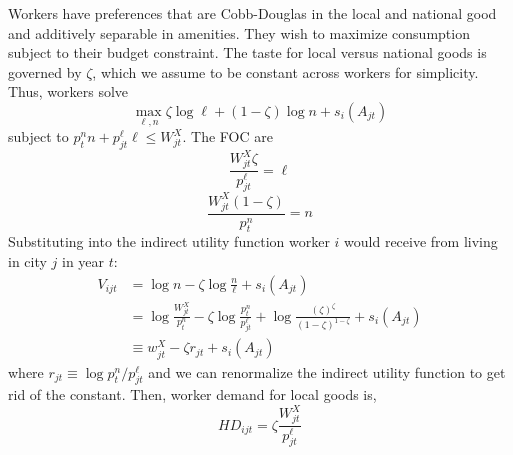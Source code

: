\documentclass{article}
\begin{document}
Workers have preferences that are Cobb-Douglas in  the local and national good and additively separable in amenities. They wish to maximize consumption subject to their budget constraint. The taste for local versus national goods is governed by $\zeta$, which we assume to be constant across workers for simplicity. Thus, workers solve 
\begin{equation}\label{eq_worker_util_max}
    \max_{\ell,n} \zeta \log \ell + (1-\zeta)\log n + s_i(A_{jt})
\end{equation}
subject to $p^n_t n + p^\ell_{jt}\ell\leq W^X_{jt}$. The FOC are
$$\frac{W^X_{jt}\zeta}{p^\ell_{jt}} = \ell$$
$$\frac{W^X_{jt}(1-\zeta)}{p^n_t} = n$$
Substituting into the indirect utility function worker $i$ would receive from living in city $j$ in year $t$:
\begin{align}
    V_{ijt} &= \log n - \zeta \log \frac{n}{\ell} + s_i(A_{jt}) \nonumber \\ 
    &= \log \frac{W^X_{jt}}{p^n_{t}} - \zeta \log\frac{p^n_{t}}{p^\ell_{jt}} + \log\frac{(\zeta)^\zeta}{(1-\zeta)^{1-\zeta}} + s_i(A_{jt})  \nonumber \\
    &\equiv w^X_{jt} - \zeta r_{jt} + s_i(A_{jt})
\end{align}
where $r_{jt} \equiv \log p_t^n/p_{jt}^\ell$ and we can renormalize the indirect utility function to get rid of the constant.
Then, worker demand for local goods is,
\begin{equation}\label{eq_worker_local_demand}
    HD_{ijt} = \zeta \frac{W^X_{jt}}{p^\ell_{jt}}
\end{equation}

 
\end{document}
